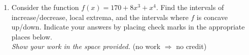 \documentclass[fleqn,12pt]{article}
\newcommand{\<}{\ensuremath{\langle}}
\renewcommand{\>}{\ensuremath{\rangle}}
\begin{document}
\begin{enumerate}










\newcommand{\qedsymbol}{\underline{\phantom{XX}} }
\item Consider the function $f(x) = 170 + 8x^3 + x^4$.  Find the intervals of
  increase/decrease, local extrema, and the intervals where $f$ is concave
  up/down. %
  Indicate your answers by placing
  check marks in the appropriate places below.\\[4pt]
\emph{Show your work in the space provided.} (no work $\Rightarrow$ no credit)


\end{enumerate}
\end{document}
